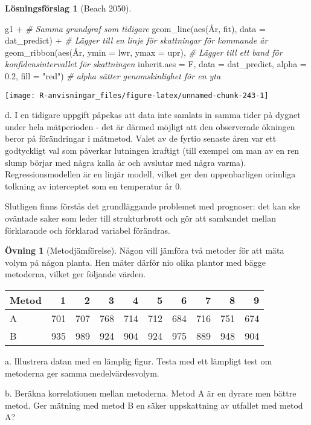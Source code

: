 \documentclass[
]{book}
\newenvironment{Shaded}{\begin{snugshade}}{\end{snugshade}}
\newcommand{\AttributeTok}[1]{\textcolor[rgb]{0.77,0.63,0.00}{#1}}
\newcommand{\CommentTok}[1]{\textcolor[rgb]{0.56,0.35,0.01}{\textit{#1}}}
\newcommand{\FloatTok}[1]{\textcolor[rgb]{0.00,0.00,0.81}{#1}}
\newcommand{\FunctionTok}[1]{\textcolor[rgb]{0.00,0.00,0.00}{#1}}
\newcommand{\NormalTok}[1]{#1}
\newcommand{\SpecialCharTok}[1]{\textcolor[rgb]{0.00,0.00,0.00}{#1}}
\newcommand{\StringTok}[1]{\textcolor[rgb]{0.31,0.60,0.02}{#1}}
\theoremstyle{definition}
\theoremstyle{definition}
\theoremstyle{definition}
\newtheorem{exercise}{Övning}[chapter]
\theoremstyle{definition}
\newtheorem{hypothesis}{Lösningsförslag}[chapter]
\theoremstyle{remark}
\begin{document}
\begin{hypothesis}[Beach 2050]
\begin{Shaded}
\begin{Highlighting}[]
\NormalTok{g1 }\SpecialCharTok{+} \CommentTok{\# Samma grundgraf som tidigare}
  \FunctionTok{geom\_line}\NormalTok{(}\FunctionTok{aes}\NormalTok{(År, fit), }\AttributeTok{data =}\NormalTok{ dat\_predict) }\SpecialCharTok{+} \CommentTok{\# Lägger till en linje för skattningar för kommande år}
  \FunctionTok{geom\_ribbon}\NormalTok{(}\FunctionTok{aes}\NormalTok{(År, }\AttributeTok{ymin =}\NormalTok{ lwr, }\AttributeTok{ymax =}\NormalTok{ upr),  }\CommentTok{\# Lägger till ett band för konfidensintervallet för skattningen}
              \AttributeTok{inherit.aes =}\NormalTok{ F, }\AttributeTok{data =}\NormalTok{ dat\_predict,}
              \AttributeTok{alpha =} \FloatTok{0.2}\NormalTok{, }\AttributeTok{fill =} \StringTok{"red"}\NormalTok{) }\CommentTok{\# alpha sätter genomskinlighet för en yta}
\end{Highlighting}
\end{Shaded}

\begin{center}\texttt{[image: R-anvisningar\_files/figure-latex/unnamed-chunk-243-1]} \end{center}

d. I en tidigare uppgift påpekas att data inte samlats in samma tider på dygnet under hela mätperioden - det är därmed möjligt att den observerade ökningen beror på förändringar i mätmetod. Valet av de fyrtio senaste åren var ett godtyckligt val som påverkar lutningen kraftigt (till exempel om man av en ren slump börjar med några kalla år och avslutar med några varma). Regressionsmodellen är en linjär modell, vilket ger den uppenbarligen orimliga tolkning av interceptet som en temperatur år 0.

Slutligen finns förstås det grundläggande problemet med prognoser: det kan ske oväntade saker som leder till strukturbrott och gör att sambandet mellan förklarande och förklarad variabel förändras.
\end{hypothesis}

\begin{exercise}[Metodjämförelse]
Någon vill jämföra två metoder för att mäta volym på någon planta. Hen mäter därför nio olika plantor med bägge metoderna, vilket ger följande värden.

\begin{table}
\centering
\begin{tabular}[t]{lrrrrrrrrr}
\toprule
Metod & 1 & 2 & 3 & 4 & 5 & 6 & 7 & 8 & 9\\
\midrule
A & 701 & 707 & 768 & 714 & 712 & 684 & 716 & 751 & 674\\
B & 935 & 989 & 924 & 904 & 924 & 975 & 889 & 948 & 904\\
\bottomrule
\end{tabular}
\end{table}

a. Illustrera datan med en lämplig figur. Testa med ett lämpligt test om metoderna ger samma medelvärdesvolym.

b. Beräkna korrelationen mellan metoderna. Metod A är en dyrare men bättre metod. Ger mätning med metod B en säker uppskattning av utfallet med metod A?
\end{exercise}
\end{document}
